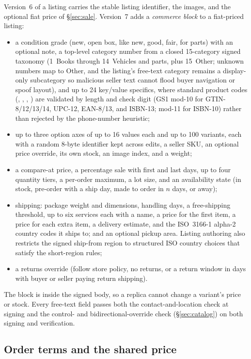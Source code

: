 Version~6 of a listing carries the stable listing identifier, the images, and the optional fiat price of \S\ref{sec:sale}. Version~7 adds a \emph{commerce block} to a fiat-priced listing:
\begin{itemize}
  \item a condition grade (new, open box, like new, good, fair, for parts) with an optional note, a top-level category number from a closed 15-category signed taxonomy (1~Books through 14~Vehicles and parts, plus 15~Other; unknown numbers map to Other, and the listing's free-text category remains a display-only subcategory so malicious seller text cannot flood buyer navigation or spoof layout), and up to 24 key/value specifics, where standard product codes (, , , ) are validated by length and check digit (GS1 mod-10 for GTIN-8/12/13/14, UPC-12, EAN-8/13, and ISBN-13; mod-11 for ISBN-10) rather than rejected by the phone-number heuristic;
  \item up to three option axes of up to 16 values each and up to 100 variants, each with a random 8-byte identifier kept across edits, a seller SKU, an optional price override, its own stock, an image index, and a weight;
  \item a compare-at price, a percentage sale with first and last days, up to four quantity tiers, a per-order maximum, a lot size, and an availability state (in stock, pre-order with a ship day, made to order in $n$ days, or away);
  \item shipping: package weight and dimensions, handling days, a free-shipping threshold, up to six services each with a name, a price for the first item, a price for each extra item, a delivery estimate, and the ISO~3166-1 alpha-2 country codes it ships to; and an optional pickup area. Listing authoring also restricts the signed ship-from region to structured ISO country choices that satisfy the short-region rules;
  \item a returns override (follow store policy, no returns, or a return window in days with buyer or seller paying return shipping).
\end{itemize}
The block is inside the signed body, so a replica cannot change a variant's price or stock. Every free-text field passes both the contact-and-location check at signing and the  control- and bidirectional-override check (\S\ref{sec:catalog}) on both signing and verification.

\subsection{Order terms and the shared price}

